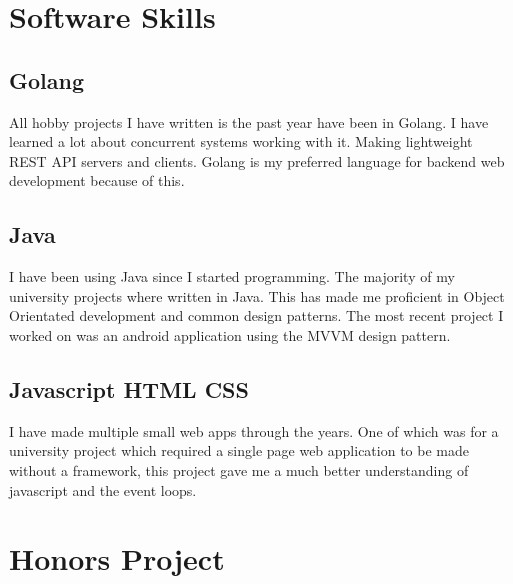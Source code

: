 \documentclass[a4paper]{cv}
\begin{document}
\begin{minipage}[t]{0.30\textwidth}

\section{Software Skills}
\subsection{Golang}
\begin{flushleft}
All hobby projects I have written is the past year have been in Golang. I have learned a lot about concurrent systems working with it. Making lightweight REST API servers and clients. Golang is my preferred language for backend web development because of this.
\end{flushleft}
\sectionspace

\subsection{Java}
\begin{flushleft}
I have been using Java since I started programming. The majority of my university projects where written in Java. This has made me proficient in Object Orientated development and common design patterns. The most recent project I worked on was an android application using the MVVM design pattern.
\end{flushleft}

\sectionspace
\subsection{Javascript \textbullet{} HTML \textbullet{} CSS}
\begin{flushleft}
I have made multiple small web apps through the years. One of which was for a university project which required a single page web application to be made without a framework, this project gave me a much better understanding of javascript and the event loops.
\end{flushleft}

\section{Honors Project}
\end{minipage}
\end{document}
